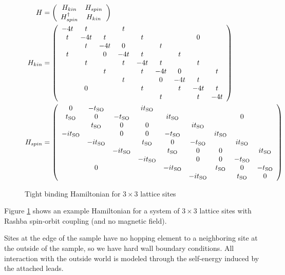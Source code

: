 \documentclass[11pt,twoside]{book}
\newcommand{\inp}[1]{\ensuremath{\left(#1\right)}}
\newcommand{\tso}{\ensuremath{t_{\textnormal{SO}}}}
\begin{document}
\begin{figure}[tb]
    \begin{align*}
        H &= \inp{
           \begin{array}{cc}
                H_{kin}  & H_{spin} \\
                H_{spin}^\dagger & H_{kin} \\
           \end{array}} \\
        H_{kin} &= \inp{
            \begin{array}{ccccccccc}
                -4t & t &  & t\\
                t & -4t & t &  & t &  &  & 0\\
                & t & -4t & 0 &  & t\\
                t &  & 0 & -4t & t &  & t\\
                & t &  & t & -4t & t &  & t\\
                &  & t &  & t & -4t & 0 &  & t\\
                &  &  & t &  & 0 & -4t & t\\
                & 0 &  &  & t &  & t & -4t & t\\
                &  &  &  &  & t &  & t & -4t\end{array}
        } \\
        H_{spin} &= \inp{
            \begin{array}{ccccccccc}
                0 & -\tso &  & i\tso\\
                \tso & 0 & -\tso &  & i\tso &  &  & 0\\
                & \tso & 0 & 0 &  & i\tso\\
                -i\tso &  & 0 & 0 & -\tso &  & i\tso\\
                & -i\tso &  & \tso & 0 & -\tso &  & i\tso\\
                &  & -i\tso &  & \tso & 0 & 0 &  & i\tso\\
                &  &  & -i\tso &  & 0 & 0 & -\tso\\
                & 0 &  &  & -i\tso &  & \tso & 0 & -\tso\\
                &  &  &  &  & -i\tso &  & \tso & 0
            \end{array}
        }
    \end{align*}
    \caption{Tight binding Hamiltonian for $ 3 \times 3 $ lattice sites}
    \label{fig:hamiltonian}
\end{figure}

Figure \ref{fig:hamiltonian} shows an example Hamiltonian for a system of
$3 \times 3$ lattice sites with Rashba spin-orbit coupling (and no magnetic
field).

Sites at the edge of the sample have no hopping element to a neighboring site
at the outside of the sample, so we have hard wall boundary conditions. All
interaction with the outside world is modeled through the self-energy induced
by the attached leads.






\end{document}

